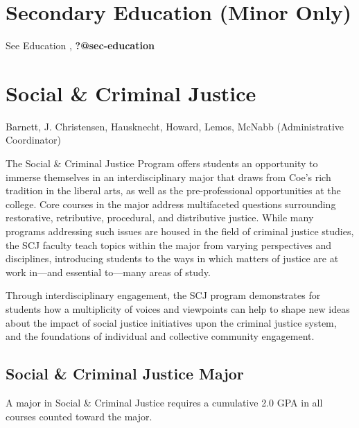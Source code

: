 \documentclass[
  letterpaper,
]{scrbook}
\begin{document}
\section{Secondary Education (Minor
Only)}\label{secondary-education-minor-only}

See Education , \textbf{?@sec-education}

\section{Social \& Criminal Justice}\label{social-criminal-justice}

Barnett, J. Christensen, Hausknecht, Howard, Lemos, McNabb
(Administrative Coordinator)

The Social \& Criminal Justice Program offers students an opportunity to
immerse themselves in an interdisciplinary major that draws from Coe's
rich tradition in the liberal arts, as well as the pre-professional
opportunities at the college. Core courses in the major address
multifaceted questions surrounding restorative, retributive, procedural,
and distributive justice. While many programs addressing such issues are
housed in the field of criminal justice studies, the SCJ faculty teach
topics within the major from varying perspectives and disciplines,
introducing students to the ways in which matters of justice are at work
in---and essential to---many areas of study.

Through interdisciplinary engagement, the SCJ program demonstrates for
students how a multiplicity of voices and viewpoints can help to shape
new ideas about the impact of social justice initiatives upon the
criminal justice system, and the foundations of individual and
collective community engagement.

\subsection{Social \& Criminal Justice
Major}\label{social-criminal-justice-major}

A major in Social \& Criminal Justice requires a cumulative 2.0 GPA in
all courses counted toward the major.
\end{document}
